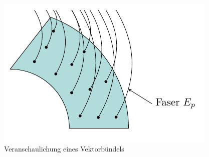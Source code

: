 \begin{figure}[H]
\centering
\includegraphics[scale=1.1]{figures/tikz/vectorbundel.pdf}
\caption{Veranschaulichung eines Vektorbündels}
\label{img:tangentialbuendel}
\end{figure}

